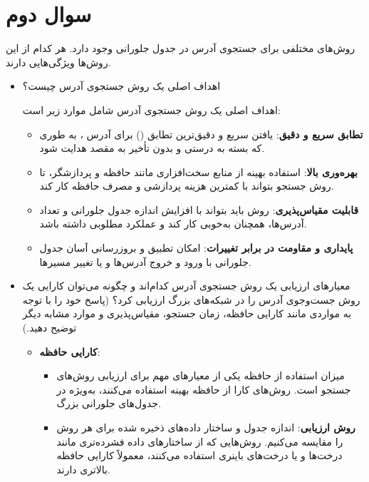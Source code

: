 \section{سوال دوم}

روش‌های مختلفی برای جستجوی آدرس  در جدول جلورانی وجود دارد. هر کدام از این روش‌ها ویژگی‌هایی دارند.


\begin{itemize}
	\item اهداف اصلی یک روش جستجوی آدرس  چیست؟
	
	\begin{qsolve}
		اهداف اصلی یک روش جستجوی آدرس  شامل موارد زیر است:
		\begin{itemize}
			\item \textbf{تطابق سریع و دقیق}: یافتن سریع و دقیق‌ترین تطابق () برای آدرس ، به طوری که بسته به درستی و بدون تأخیر به مقصد هدایت شود.
			\item \textbf{بهره‌وری بالا}: استفاده بهینه از منابع سخت‌افزاری مانند حافظه و پردازشگر، تا روش جستجو بتواند با کمترین هزینه پردازشی و مصرف حافظه کار کند.
			\item \textbf{قابلیت مقیاس‌پذیری}: روش باید بتواند با افزایش اندازه جدول جلورانی و تعداد آدرس‌ها، همچنان به‌خوبی کار کند و عملکرد مطلوبی داشته باشد.
			\item \textbf{پایداری و مقاومت در برابر تغییرات}: امکان تطبیق و بروزرسانی آسان جدول جلورانی با ورود و خروج آدرس‌ها و یا تغییر مسیرها.
		\end{itemize}
	\end{qsolve}
	
	
	\item معیارهای ارزیابی یک روش جستجوی آدرس  کدام‌اند و چگونه می‌توان کارایی یک روش جست‌و‌جوی آدرس  را در شبکه‌های بزرگ ارزیابی کرد؟ (پاسخ خود را با توجه به مواردی مانند کارایی حافظه، زمان جستجو، مقیاس‌پذیری و موارد مشابه دیگر توضیح دهید.)
	
	\begin{qsolve}
		\begin{itemize}
			\item \textbf{کارایی حافظه}:
			\begin{itemize}
				\item میزان استفاده از حافظه یکی از معیارهای مهم برای ارزیابی روش‌های جستجو است. روش‌های کارا از حافظه بهینه استفاده می‌کنند، به‌ویژه در جدول‌های جلورانی بزرگ.
				\item \textbf{روش ارزیابی}: اندازه جدول و ساختار داده‌های ذخیره شده برای هر روش را مقایسه می‌کنیم. روش‌هایی که از ساختارهای داده فشرده‌تری مانند درخت‌ها و یا درخت‌های باینری استفاده می‌کنند، معمولاً کارایی حافظه بالاتری دارند.
			\end{itemize}
			

\end{itemize}
\end{qsolve}
\end{itemize}
